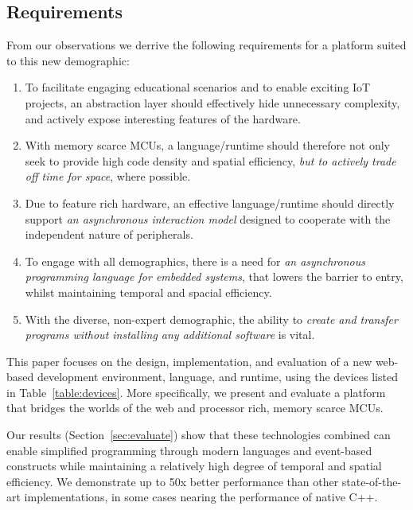 \subsection{Requirements}
\label{sec:requirements}

From our observations we derrive the following requirements for a platform suited to this new demographic:

\begin{enumerate}

    \item To facilitate engaging educational scenarios and to enable exciting IoT projects, an abstraction layer should effectively hide unnecessary complexity, and actively expose interesting features of the hardware.

    \item With memory scarce MCUs, a language/runtime should therefore not only seek to provide high code density and spatial efficiency, \emph{but to actively trade off time for space}, where possible.

    \item Due to feature rich hardware, an effective language/runtime should directly support \emph{an asynchronous interaction model} designed to cooperate with the independent nature of peripherals.

    \item To engage with all demographics, there is a need for \emph{an asynchronous programming language for embedded systems}, that lowers the barrier to entry, whilst maintaining temporal and spacial efficiency.

    \item With the diverse, non-expert demographic, the ability to \emph{create and transfer programs without installing any additional software} is vital.

\end{enumerate}

This paper focuses on the design, implementation, and evaluation of a new web-based development environment, language, and runtime, using the devices listed in Table~\ref{table:devices}. More specifically, we present and evaluate a platform that bridges the worlds of the web and processor rich, memory scarce MCUs.

Our results (Section~\ref{sec:evaluate}) show that these technologies combined can enable simplified programming through modern languages and event-based constructs while maintaining a relatively high degree of temporal and spatial efficiency. We demonstrate up to 50x better performance than other state-of-the-art implementations, in some cases nearing the performance of native C++.

